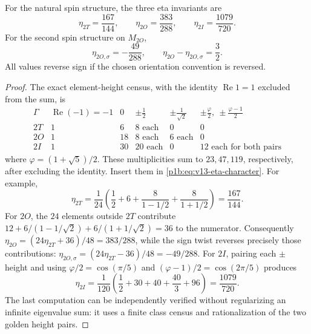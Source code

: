 \documentclass[11pt]{article}
\begin{document}
\begin{corollary}
\label{p1b:cor:v13-exact-eta-values}
For the natural spin structure, the three eta invariants are
\begin{equation}
\label{p1b:eq:v13-eta-fractions}
 \boxed{\eta_{2T}=\frac{167}{144},\qquad
 \eta_{2O}=\frac{383}{288},\qquad
 \eta_{2I}=\frac{1079}{720}.}
\end{equation}
For the second spin structure on $M_{2O}$,
\begin{equation}
\label{p1b:eq:v13-eta-octa-second}
 \boxed{\eta_{2O,\sigma}=-\frac{49}{288},\qquad
   \eta_{2O}-\eta_{2O,\sigma}=\frac32.}
\end{equation}
All values reverse sign if the chosen orientation convention is
reversed.
\end{corollary}
\begin{proof}
The exact element-height census, with the identity $\operatorname{Re}1=1$
excluded from the sum, is
\[
\begin{array}{c|c|c|c|c|c}
 \Gamma&\operatorname{Re}(-1)=-1&0&\pm\frac12
 &\pm\frac1{\sqrt2}
 &\pm\frac{\varphi}{2},\ \pm\frac{\varphi-1}{2}\\\hline
 2T&1&6&8\text{ each}&0&0\\
 2O&1&18&8\text{ each}&6\text{ each}&0\\
 2I&1&30&20\text{ each}&0&12\text{ each for both pairs}
\end{array}
\]
where $\varphi=(1+\sqrt5)/2$. These multiplicities sum to
$23,47,119$, respectively, after excluding the identity.  Insert
them in \eqref{p1b:eq:v13-eta-character}.
For example,
\[
 \eta_{2T}=\frac1{24}
 \left(\frac12+6+\frac8{1-1/2}+\frac8{1+1/2}\right)
 =\frac{167}{144}.
\]
For $2O$, the $24$ elements outside $2T$ contribute
$12+6/(1-1/\sqrt2)+6/(1+1/\sqrt2)=36$ to the numerator.
Consequently $\eta_{2O}=(24\eta_{2T}+36)/48=383/288$,
while the sign twist reverses precisely those contributions:
$\eta_{2O,\sigma}=(24\eta_{2T}-36)/48=-49/288$.
For $2I$, pairing each $\pm$ height and using
$\varphi/2=\cos(\pi/5)$ and $(\varphi-1)/2=\cos(2\pi/5)$
produces
\[
 \eta_{2I}=\frac1{120}
 \left(\frac12+30+40+\frac{40}{3}+96\right)
 =\frac{1079}{720}.
\]
The last computation can be independently verified without
regularizing an infinite eigenvalue sum: it uses a finite class
census and rationalization of the two golden height pairs.
\end{proof}
\end{document}
